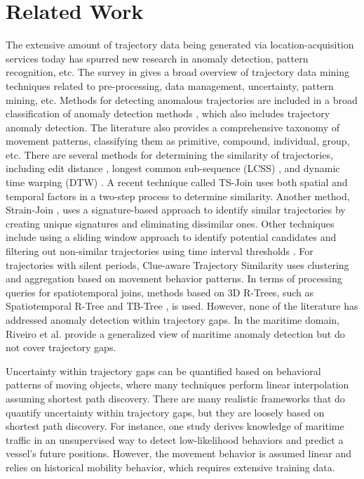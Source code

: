 \documentclass[acmsmall]{acmart}
\begin{document}
\section{Related Work}
\label{section:Related_work}
The extensive amount of trajectory data being generated via location-acquisition services today has spurred new research in anomaly detection, pattern recognition, etc. The survey in \cite{zheng2015trajectory} gives a broad overview of trajectory data mining techniques related to pre-processing, data management, uncertainty, pattern mining, etc. Methods for detecting anomalous trajectories are included in a broad classification of anomaly detection methods \cite{chandola2009anomaly}, which also includes trajectory anomaly detection. The literature \cite{dodge2008towards} also provides a comprehensive taxonomy of movement patterns, classifying them as primitive, compound, individual, group, etc. There are several methods for determining the similarity of trajectories, including edit distance \cite{chen2005robust}, longest common sub-sequence (LCSS) \cite{lin1995fast}, and dynamic time warping (DTW) \cite{yi1998efficient}. A recent technique called TS-Join \cite{shang2017trajectory} uses both spatial and temporal factors in a two-step process to determine similarity. Another method, Strain-Join \cite{ta2017signature}, uses a signature-based approach to identify similar trajectories by creating unique signatures and eliminating dissimilar ones. Other techniques include using a sliding window approach \cite{bakalov2005efficient,chen2009design} to identify potential candidates and filtering out non-similar trajectories using time interval thresholds \cite{bakalov2006continuous,ding2008efficient}. For trajectories with silent periods, Clue-aware Trajectory Similarity \cite{hung2015clustering} uses clustering and aggregation based on movement behavior patterns. In terms of processing queries for spatiotemporal joins, methods based on 3D R-Trees, such as Spatiotemporal R-Tree and TB-Tree \cite{pfoser2000novel}, is used. However, none of the literature has addressed anomaly detection within trajectory gaps. In the maritime domain, Riveiro et al. \cite{riveiro2018maritime} provide a generalized view of maritime anomaly detection but do not cover trajectory gaps.

Uncertainty within trajectory gaps can be quantified based on behavioral patterns of moving objects, where many techniques perform linear interpolation assuming shortest path discovery. There are many realistic frameworks \cite{pallotta2013vessel,chen2013iboat,lei2016framework} that do quantify uncertainty within trajectory gaps, but they are loosely based on shortest path discovery. For instance, one study \cite{pallotta2013vessel} derives knowledge of maritime traffic in an unsupervised way to detect low-likelihood behaviors and predict a vessel's future positions. However, the movement behavior is assumed linear and relies on historical mobility behavior, which requires extensive training data. 
\end{document}
